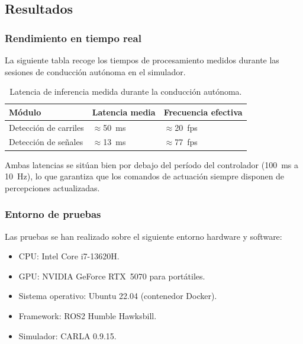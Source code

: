 \documentclass[12pt, a4paper]{article}
\begin{document}
\subsection{Resultados}

\subsubsection{Rendimiento en tiempo real}

La siguiente tabla recoge los tiempos de procesamiento medidos durante las sesiones de conducción autónoma en el simulador.

\begin{table}[H]
    \centering
    \caption{Latencia de inferencia medida durante la conducción autónoma.}
    \label{tab:resultados}
    \begin{tabular}{lll}
        \toprule
        \textbf{Módulo} & \textbf{Latencia media} & \textbf{Frecuencia efectiva} \\
        \midrule
        Detección de carriles  & $\approx$50~ms  & $\approx$20~fps \\
        Detección de señales   & $\approx$13~ms  & $\approx$77~fps \\
        \bottomrule
    \end{tabular}
\end{table}

Ambas latencias se sitúan bien por debajo del período del controlador (100~ms a 10~Hz), lo que garantiza que los comandos de actuación siempre disponen de percepciones actualizadas.

\subsubsection{Entorno de pruebas}

Las pruebas se han realizado sobre el siguiente entorno hardware y software:

\begin{itemize}
    \item CPU: Intel Core i7-13620H.
    \item GPU: NVIDIA GeForce RTX~5070 para portátiles.
    \item Sistema operativo: Ubuntu 22.04 (contenedor Docker).
    \item Framework: ROS2 Humble Hawksbill.
    \item Simulador: CARLA 0.9.15.
\end{itemize}
\end{document}
